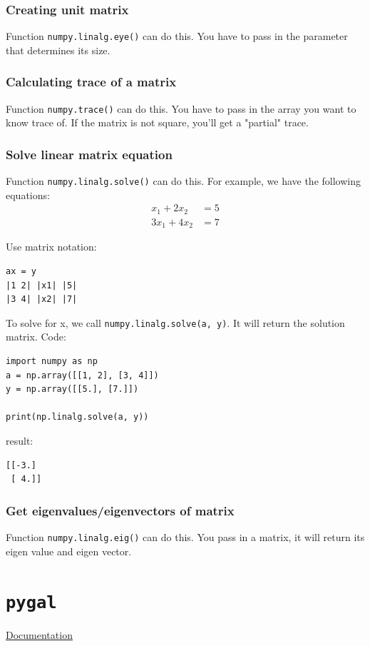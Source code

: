 \documentclass[12pt]{book}
\begin{document}
\subsection{Creating unit matrix}
\label{sec:org9a86735}
Function \texttt{numpy.linalg.eye()} can do this. You have to pass in the parameter that determines its size.
\subsection{Calculating trace of a matrix}
\label{sec:org1dd843b}
Function \texttt{numpy.trace()} can do this. You have to pass in the array you want to know trace of. If the matrix is not square, you'll get a "partial" trace.
\subsection{Solve linear matrix equation}
\label{sec:orgb2975fc}
Function \texttt{numpy.linalg.solve()} can do this. For example, we have the following equations:
\begin{align*}
x_1 + 2x_2 &= 5 \\
3x_1 + 4x_2 &= 7
\end{align*}

Use matrix notation:
\begin{verbatim}
ax = y
|1 2| |x1| |5|
|3 4| |x2| |7|
\end{verbatim}

To solve for x, we call \texttt{numpy.linalg.solve(a, y)}. It will return the solution matrix. Code:
\begin{verbatim}
import numpy as np
a = np.array([[1, 2], [3, 4]])
y = np.array([[5.], [7.]])

print(np.linalg.solve(a, y))
\end{verbatim}
result:
\begin{verbatim}
[[-3.]
 [ 4.]]
\end{verbatim}
\subsection{Get eigenvalues/eigenvectors of matrix}
\label{sec:org4ea9750}
Function \texttt{numpy.linalg.eig()} can do this. You pass in a matrix, it will return its eigen value and eigen vector.

\chapter{\texttt{pygal}}
\label{sec:org2f05816}
\href{http://pygal.org/en/stable/documentation/index.html}{Documentation}
\end{document}
